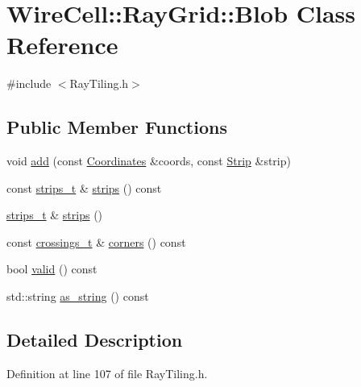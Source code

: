 \hypertarget{class_wire_cell_1_1_ray_grid_1_1_blob}{}\section{Wire\+Cell\+:\+:Ray\+Grid\+:\+:Blob Class Reference}
\label{class_wire_cell_1_1_ray_grid_1_1_blob}


{\ttfamily \#include $<$Ray\+Tiling.\+h$>$}

\subsection*{Public Member Functions}
\begin{DoxyCompactItemize}
\item 
void \hyperlink{class_wire_cell_1_1_ray_grid_1_1_blob_a5346f52ed7b1ffd40324bdf32095c392}{add} (const \hyperlink{class_wire_cell_1_1_ray_grid_1_1_coordinates}{Coordinates} \&coords, const \hyperlink{struct_wire_cell_1_1_ray_grid_1_1_strip}{Strip} \&strip)
\item 
const \hyperlink{namespace_wire_cell_1_1_ray_grid_a06c9ce08c0358d22fae3185aff8a9b7c}{strips\+\_\+t} \& \hyperlink{class_wire_cell_1_1_ray_grid_1_1_blob_a4334dac5e1c417337fc156c828036966}{strips} () const
\item 
\hyperlink{namespace_wire_cell_1_1_ray_grid_a06c9ce08c0358d22fae3185aff8a9b7c}{strips\+\_\+t} \& \hyperlink{class_wire_cell_1_1_ray_grid_1_1_blob_a357044cca3634e0eb681a5d5f2f1e58c}{strips} ()
\item 
const \hyperlink{namespace_wire_cell_1_1_ray_grid_a100185dcaa66f6b2b42c53c40c37fb49}{crossings\+\_\+t} \& \hyperlink{class_wire_cell_1_1_ray_grid_1_1_blob_afe8d4f5b3c993780eecf4944e92fdd55}{corners} () const
\item 
bool \hyperlink{class_wire_cell_1_1_ray_grid_1_1_blob_a54c443df9fc36be31985e8be787c5651}{valid} () const
\item 
std\+::string \hyperlink{class_wire_cell_1_1_ray_grid_1_1_blob_a5cd495991564b493c9b8dcb267c090d8}{as\+\_\+string} () const
\end{DoxyCompactItemize}


\subsection{Detailed Description}


Definition at line 107 of file Ray\+Tiling.\+h.



